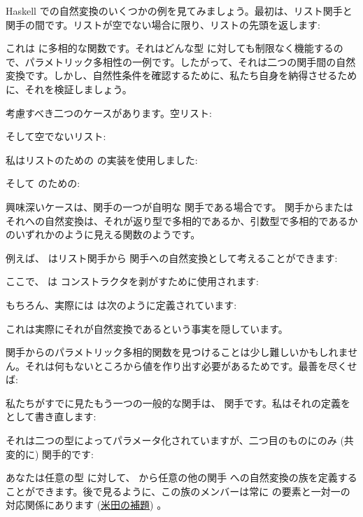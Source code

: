 Haskell での自然変換のいくつかの例を見てみましょう。最初は、リスト関手と  関手の間です。リストが空でない場合に限り、リストの先頭を返します: 

これは  に多相的な関数です。それはどんな型  に対しても制限なく機能するので、パラメトリック多相性の一例です。したがって、それは二つの関手間の自然変換です。しかし、自然性条件を確認するために、私たち自身を納得させるために、それを検証しましょう。

考慮すべき二つのケースがあります。空リスト: 


そして空でないリスト: 


私はリストのための  の実装を使用しました: 

そして  のための: 

興味深いケースは、関手の一つが自明な  関手である場合です。  関手からまたはそれへの自然変換は、それが返り型で多相的であるか、引数型で多相的であるかのいずれかのように見える関数のようです。

例えば、 はリスト関手から  関手への自然変換として考えることができます: 

ここで、 は  コンストラクタを剥がすために使用されます: 

もちろん、実際には  は次のように定義されています: 

これは実際にそれが自然変換であるという事実を隠しています。

 関手からのパラメトリック多相的関数を見つけることは少し難しいかもしれません。それは何もないところから値を作り出す必要があるためです。最善を尽くせば: 

私たちがすでに見たもう一つの一般的な関手は、 関手です。私はそれの定義をとして書き直します: 

それは二つの型によってパラメータ化されていますが、二つ目のものにのみ (共変的に) 関手的です: 

あなたは任意の型  に対して、 から任意の他の関手  への自然変換の族を定義することができます。後で見るように、この族のメンバーは常に  の要素と一対一の対応関係にあります (\hyperref[the-yoneda-lemma]{米田の補題}) 。

